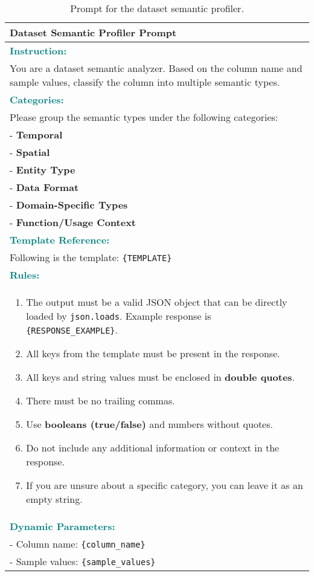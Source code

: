 \begin{table*}
    \small
    \centering
    \begin{tabular}{p{14cm}}
    \toprule
    \textbf{Dataset Semantic Profiler Prompt} \\
    \midrule
    \textcolor{teal}{\textbf{Instruction:}} \\
    You are a dataset semantic analyzer. Based on the column name and sample values, classify the column into multiple semantic types. \\

    \textcolor{teal}{\textbf{Categories:}} \\
    Please group the semantic types under the following categories: \\
    - \textbf{Temporal} \\
    - \textbf{Spatial} \\
    - \textbf{Entity Type} \\
    - \textbf{Data Format} \\
    - \textbf{Domain-Specific Types} \\
    - \textbf{Function/Usage Context} \\

    \textcolor{teal}{\textbf{Template Reference:}} \\
    Following is the template: \texttt{\{TEMPLATE\}} \\

    \textcolor{teal}{\textbf{Rules:}} \\
    \begin{enumerate}
        \item The output must be a valid JSON object that can be directly loaded by \texttt{json.loads}. Example response is \texttt{\{RESPONSE\_EXAMPLE\}}.
        \item All keys from the template must be present in the response.
        \item All keys and string values must be enclosed in \textbf{double quotes}.
        \item There must be no trailing commas.
        \item Use \textbf{booleans (true/false)} and numbers without quotes.
        \item Do not include any additional information or context in the response.
        \item If you are unsure about a specific category, you can leave it as an empty string.
    \end{enumerate} \\

    \textcolor{teal}{\textbf{Dynamic Parameters:}} \\
    - Column name: \texttt{\{column\_name\}} \\
    - Sample values: \texttt{\{sample\_values\}} \\

    \bottomrule
    \end{tabular}
    \caption{Prompt for the dataset semantic profiler.}
    \label{tab:prompt_semantic_profile}
\end{table*}
